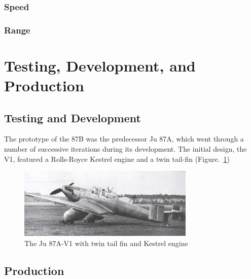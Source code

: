 \documentclass[a4paper, fontsize=11pt]{scrartcl} %
\begin{document}
\subsubsection{Speed}
\subsubsection{Range}
\section{Testing, Development, and Production}
\subsection{Testing and Development}
The prototype of the 87B was the predecessor Ju 87A, which went through
a number of successive iterations during its development. The initial
design, the V1, featured a Rolls-Royce Kestrel engine and a twin
tail-fin (Figure.~\ref{fig:v1})

\begin{figure}[h]
  \centering
  \includegraphics[width=0.75\textwidth]{media/ju87av0}
  \caption{The Ju 87A-V1 with twin tail fin and Kestrel engine
    \autocite{junkers87}}
  \label{fig:v1}
\end{figure}
\subsection{Production}
\printbibliography
\end{document}
